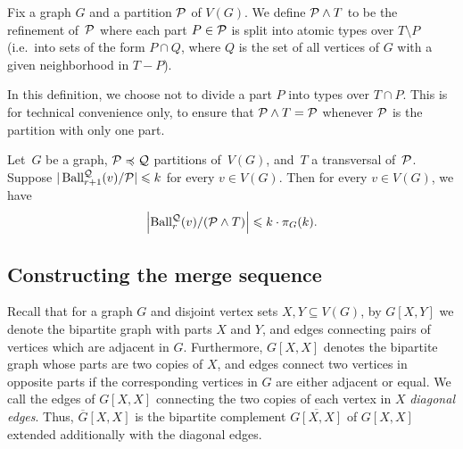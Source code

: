 \begin{definition}
    Fix a graph $G$ and a partition $\mathcal P$ of $V(G)$. We define $\mathcal P \wedge T$ to be the refinement of~$\mathcal P$ where each part $P \in \mathcal P$ is split into atomic types over $T \setminus P$
    (i.e.\ into sets of the form $P\cap Q$, where $Q$ is the set of all vertices of $G$ with a given neighborhood in $T-P$).
\end{definition}

\noindent In this definition, we choose not to divide a part $P$ into types over $T \cap P$. This is for technical convenience only, to ensure that $\mathcal P \wedge T = \mathcal P$ whenever $\mathcal P$ is the partition with only one part.


\begin{lemma}\label{lem:transversalRefinement}
	Let~$G $ be a graph, $\mathcal P\preccurlyeq\mathcal Q$ partitions of~$V(G)$, and~$T$ a transversal of~$\mathcal P$.
  Suppose $|\operatorname{Ball}^\mathcal Q_{r+1}(v)/\mathcal P| \leqslant k$ for every $v\in V(G)$.
  Then for every $v\in V(G)$, we have
  \[
    \left|\operatorname{Ball}^{\mathcal Q}_r(v)/(\mathcal P \wedge T)\right|\leqslant k \cdot \pi_G(k).
  \]
\end{lemma}


\subsection{Constructing the merge sequence}



Recall that for a graph 
$G$ and disjoint vertex sets $X,Y\subseteq V(G)$,
by $G[X,Y]$ we denote the bipartite graph with parts $X$ and $Y$, and edges connecting pairs of vertices which are adjacent in $G$.
Furthermore, $G[X,X]$
denotes the bipartite graph whose parts are two copies of $X$,
and edges connect two vertices in opposite parts if the corresponding vertices in $G$ are either adjacent or equal.
We call the edges of $G[X,X]$ connecting the two copies of each vertex in $X$ \emph{diagonal edges}.
Thus,
${\overline G[X,X]}$ is the bipartite complement  $\overline {G[X,X]}$ of $G[X,X]$ extended additionally with the diagonal edges.


